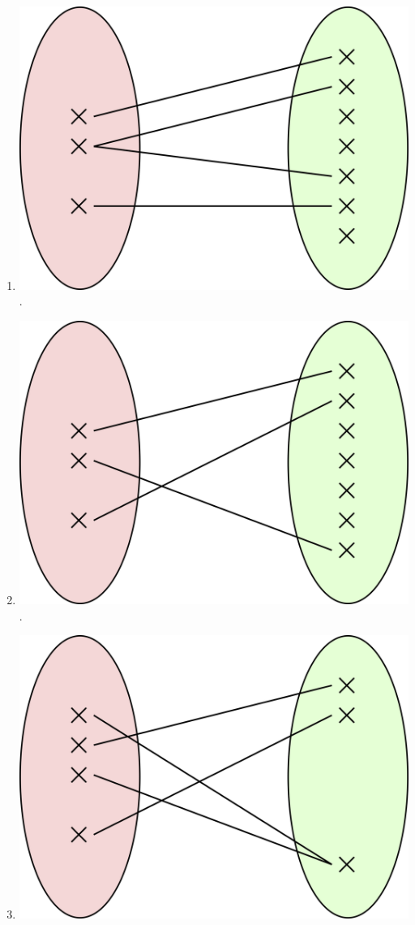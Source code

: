 \documentclass[a4paper,11pt]{article}
\begin{document}
\begin{multicols}{2}
\begin{enumerate}[\bfseries 1.]
			.\dotfill
	\item 	\includegraphics[width=\myw]{3.png}\\
	
			.\dotfill
	\item 	\includegraphics[width=\myw]{4.png}\\
	
				.\dotfill

	\item 	\includegraphics[width=\myw]{5.png}\\
	

\end{enumerate}
\end{multicols}
\end{document}
